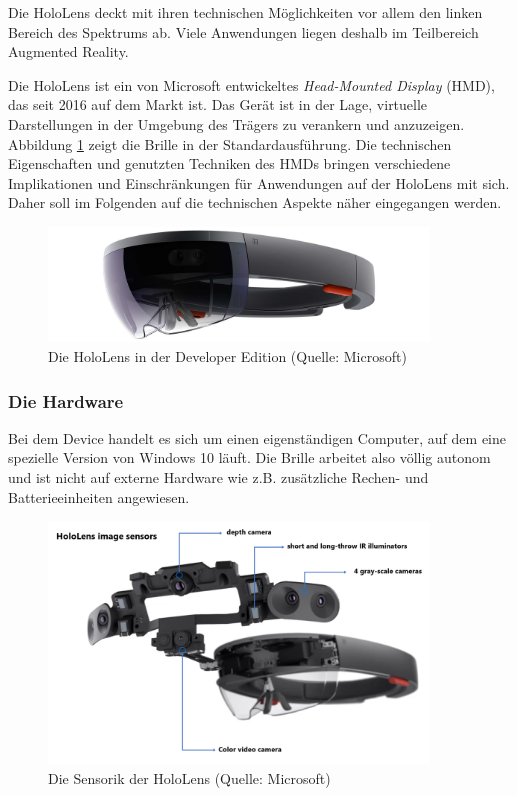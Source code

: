 Die HoloLens deckt mit ihren technischen Möglichkeiten vor allem den linken Bereich des Spektrums ab. Viele Anwendungen liegen deshalb im Teilbereich Augmented Reality.

Die HoloLens ist ein von Microsoft entwickeltes \textit{Head-Mounted Display} (HMD), das seit 2016 auf dem Markt ist. Das Gerät ist in der Lage, virtuelle Darstellungen in der Umgebung des Trägers zu verankern und anzuzeigen. Abbildung \ref{img:hololens} zeigt die Brille in der Standardausführung. Die technischen Eigenschaften und genutzten Techniken des HMDs bringen verschiedene Implikationen und Einschränkungen für Anwendungen auf der HoloLens mit sich. Daher soll im Folgenden auf die technischen Aspekte näher eingegangen werden.\\

\begin{figure}[h!]
	\centering
	\includegraphics[width=0.9\textwidth]{images/papers/hololens.jpg}
	\caption{Die HoloLens in der Developer Edition (Quelle: Microsoft)}
	\label{img:hololens}
\end{figure}

\subsubsection{Die Hardware}
Bei dem Device handelt es sich um einen eigenständigen Computer, auf dem eine spezielle Version von Windows 10 läuft. Die Brille arbeitet also völlig autonom und ist nicht auf externe Hardware wie z.B. zusätzliche Rechen- und Batterieeinheiten angewiesen.\\

\label{sec-2-1-2}
\begin{figure}[h!]
	\centering
	\includegraphics[width=0.9\textwidth]{images/papers/hololens_tech.png}
	\caption{Die Sensorik der HoloLens (Quelle: Microsoft)}
	\label{img:hololens_tech}
\end{figure}

